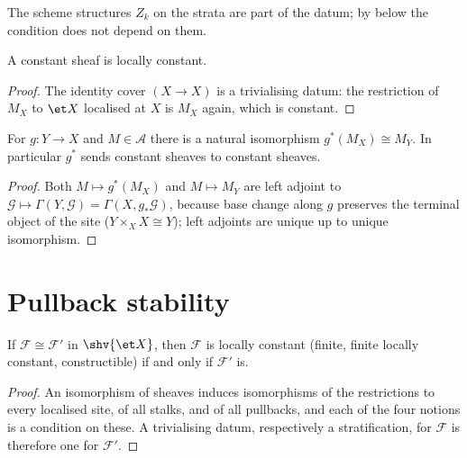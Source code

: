 The scheme structures $Z_k$ on the strata are part of the datum; by
 below the condition does
not depend on them.

\begin{lemma}
\label{lemma:constructible-constant-locally-constant}
\leanok
A constant sheaf is locally constant.
\end{lemma}
\begin{proof}
\leanok
The identity cover $(X\to X)$ is a trivialising datum: the restriction of
$M_X$ to $\et X$ localised at $X$ is $M_X$ again, which is constant.
\end{proof}

\begin{lemma}
\label{lemma:constructible-pullback-constant}
\leanok
For $g\colon Y\to X$ and $M\in\mathcal A$ there is a natural isomorphism
$g^*(M_X)\cong M_Y$.  In particular $g^*$ sends constant sheaves to constant
sheaves.
\end{lemma}
\begin{proof}
\leanok
Both $M\mapsto g^*(M_X)$ and $M\mapsto M_Y$ are left adjoint to
$\mathcal G\mapsto\Gamma(Y,\mathcal G)=\Gamma(X,g_*\mathcal G)$, because
base change along $g$ preserves the terminal object of the site
($Y\times_XX\cong Y$); left adjoints are unique up to unique isomorphism.
\end{proof}

\section{Pullback stability}\label{sec:constructible-pullback}

\begin{lemma}
\label{lemma:constructible-iso-invariance}
\leanok
If $\mathcal F\cong\mathcal F'$ in $\shv{\et X}$, then $\mathcal F$ is
locally constant (finite, finite locally constant, constructible) if and
only if $\mathcal F'$ is.
\end{lemma}
\begin{proof}
\leanok
An isomorphism of sheaves induces isomorphisms of the restrictions to every
localised site, of all stalks, and of all pullbacks, and each of the four
notions is a condition on these.  A trivialising datum, respectively a
stratification, for $\mathcal F$ is therefore one for $\mathcal F'$.
\end{proof}

